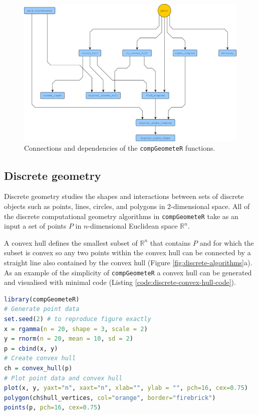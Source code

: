 \documentclass[12pt, a4paper]{article}
\begin{document}
\begin{figure}[ht]
\centering
\includegraphics[width=15cm]{figures/software-structure/software-structure.png}
\caption{Connections and dependencies of the \texttt{compGeometeR} functions.}
\label{fig:software-structure}
\end{figure}

\subsection{Discrete geometry}

Discrete geometry studies the shapes and interactions between sets of discrete objects such as points, lines, circles, and polygons in 2-dimensional space.  All of the discrete computational geometry algorithms in \texttt{compGeometeR} take as an input a set of points $P$ in $n$-dimensional Euclidean space $\mathbb{R}^n$.

A convex hull \citep{barber-1996} defines the smallest subset of $\mathbb{R}^n$ that contains $P$ and for which the subset is convex so any two points within the convex hull can be connected by a straight line also contained by the convex hull (Figure \ref{fig:discrete-algorithms}a).  As an example of the simplicity of \texttt{compGeometeR} a convex hull can be generated and visualised with minimal code (Listing \ref{code:discrete-convex-hull-code}).

\begin{lstlisting}[language=R, caption=Example \texttt{R} code to create a discrete convex hull with \texttt{compGeometeR}, label={code:discrete-convex-hull-code}]
library(compGeometeR)
# Generate point data
set.seed(2) # to reproduce figure exactly
x = rgamma(n = 20, shape = 3, scale = 2)
y = rnorm(n = 20, mean = 10, sd = 2)
p = cbind(x, y)
# Create convex hull
ch = convex_hull(p)
# Plot point data and convex hull
plot(x, y, yaxt="n", xaxt="n", xlab="", ylab = "", pch=16, cex=0.75)
polygon(ch$hull_vertices, col="orange", border="firebrick")
points(p, pch=16, cex=0.75)
\end{lstlisting}
\end{document}
